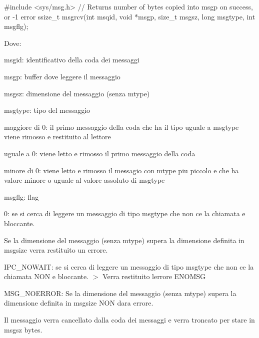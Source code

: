 \begin{DoxyCode}
\textcolor{preprocessor}{#include <sys/msg.h>}
\textcolor{comment}{// Returns number of bytes copied into msgp on success, or -1 error}
ssize\_t msgrcv(\textcolor{keywordtype}{int} msqid, \textcolor{keywordtype}{void} *msgp, \textcolor{keywordtype}{size\_t} msgsz, \textcolor{keywordtype}{long} msgtype, \textcolor{keywordtype}{int} msgflg);
\end{DoxyCode}


Dove\+:
\begin{DoxyItemize}
\item {\ttfamily msgid}\+: identificativo della coda dei messaggi
\item {\ttfamily msgp}\+: buffer dove leggere il messaggio
\item {\ttfamily msgsz}\+: dimensione del messaggio (senza {\ttfamily mtype})
\item {\ttfamily msgtype}\+: tipo del messaggio
\begin{DoxyItemize}
\item maggiore di 0\+: il primo messaggio della coda che ha il tipo uguale a msgtype viene rimosso e restituito al lettore
\item uguale a 0\+: viene letto e rimosso il primo messaggio della coda
\item minore di 0\+: viene letto e rimosso il messagio con mtype piu\textquotesingle{} piccolo e che ha valore minore o uguale al valore assoluto di {\ttfamily msgtype}
\end{DoxyItemize}
\item {\ttfamily msgflg}\+: flag
\begin{DoxyItemize}
\item 0\+: se si cerca di leggere un messaggio di tipo msgtype che non c\textquotesingle{}e\textquotesingle{} la chiamata e\textquotesingle{} bloccante.

Se la dimensione del messaggio (senza mtype) supera la dimensione definita in msgsize verra\textquotesingle{} restituito un errore.
\item {\ttfamily I\+P\+C\+\_\+\+N\+O\+W\+A\+IT}\+: se si cerca di leggere un messaggio di tipo msgtype che non c\textquotesingle{}e\textquotesingle{} la chiamata N\+ON e\textquotesingle{} bloccante. $>$ Verra\textquotesingle{} restituito l\textquotesingle{}errore E\+N\+O\+M\+SG
\item {\ttfamily M\+S\+G\+\_\+\+N\+O\+E\+R\+R\+OR}\+: Se la dimensione del messaggio (senza mtype) supera la dimensione definita in msgsize N\+ON dara\textquotesingle{} errore.

Il messaggio verra\textquotesingle{} cancellato dalla coda dei messaggi e verra\textquotesingle{} troncato per stare in msgsz bytes.
\end{DoxyItemize}
\end{DoxyItemize}

